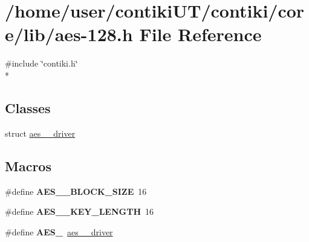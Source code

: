 \hypertarget{aes-128_8h}{}\section{/home/user/contiki\+U\+T/contiki/core/lib/aes-\/128.h File Reference}
\label{aes-128_8h}
{\ttfamily \#include \char`\"{}contiki.\+h\char`\"{}}\\*
\subsection*{Classes}
\begin{DoxyCompactItemize}
\item 
struct \hyperlink{structaes__128__driver}{aes\+\_\+\_\+driver}
\end{DoxyCompactItemize}
\subsection*{Macros}
\begin{DoxyCompactItemize}
\item 
\hypertarget{aes-128_8h_abce60efe6dbf866b21dbedbb0da50de9}{}\#define {\bfseries A\+E\+S\+\_\+\_\+\+B\+L\+O\+C\+K\+\_\+\+S\+I\+Z\+E}~16\label{aes-128_8h_abce60efe6dbf866b21dbedbb0da50de9}

\item 
\hypertarget{aes-128_8h_aa49f87a8fdf7ee58b6b85b6c75bacbb3}{}\#define {\bfseries A\+E\+S\+\_\+\_\+\+K\+E\+Y\+\_\+\+L\+E\+N\+G\+T\+H}~16\label{aes-128_8h_aa49f87a8fdf7ee58b6b85b6c75bacbb3}

\item 
\hypertarget{aes-128_8h_a16cea710e84ab48a922d59ae239bf9e8}{}\#define {\bfseries A\+E\+S\+\_}~\hyperlink{structaes__128__driver}{aes\+\_\+\_\+driver}\label{aes-128_8h_a16cea710e84ab48a922d59ae239bf9e8}

\end{DoxyCompactItemize}
